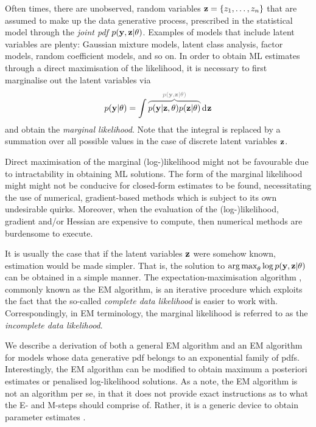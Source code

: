 Often times, there are unobserved, random variables ${\mathbf z}=\{z_1,\dots,z_n\}$ that are assumed to make up the data generative process, prescribed in the statistical model through the \emph{joint pdf} $p({\mathbf y},{\mathbf z}|\theta)$.
Examples of models that include latent variables are plenty: Gaussian mixture models, latent class analysis, factor models, random coefficient models, and so on.
In order to obtain ML estimates through a direct maximisation of the likelihood, it is necessary to first marginalise out the latent variables via
\begin{equation}\label{eq:varint}
  p(\by|\theta) 
  = \int 
  \greyoverbrace{p(\by|\bz,\theta)p(\bz|\theta)}{p(\by,\bz|\theta)}
  \dint \bz
\end{equation}
and obtain the \emph{marginal likelihood}.
Note that the integral is replaced by a summation over all possible values in the case of discrete latent variables ${\mathbf z}$.

Direct maximisation of the marginal (log-)likelihood might not be favourable due to intractability in obtaining ML solutions.
The form of the marginal likelihood might might not be conducive for closed-form estimates to be found, necessitating the use of numerical, gradient-based methods which is subject to its own undesirable quirks.
Moreover, when the evaluation of the (log-)likelihood, gradient and/or Hessian are expensive to compute, then numerical methods are burdensome to execute.

It is usually the case that if the latent variables ${\mathbf z}$ were somehow known, estimation would be made simpler.
That is, the solution to $\operatorname*{arg\,max}_\theta \log p({\mathbf y},{\mathbf z}|\theta)$ can be obtained in a simple manner.
The expectation-maximisation algorithm \citep{dempster1977maximum}, commonly known as the EM algorithm, is an iterative procedure which exploits the fact that the so-called \emph{complete data likelihood} is easier to work with.
Correspondingly, in EM terminology, the marginal likelihood is referred to as the \emph{incomplete data likelihood}.

We describe a derivation of both a general EM algorithm and an EM algorithm for models whose data generative pdf belongs to an exponential family of pdfs. 
Interestingly, the EM algorithm can be modified to obtain maximum a posteriori estimates or penalised log-likelihood solutions.
As a note, the EM algorithm is not an algorithm per se, in that it does not provide exact instructions as to what the E- and M-steps should comprise of.
Rather, it is a generic device to obtain parameter estimates \citep{mclachlan2007algorithm}.

